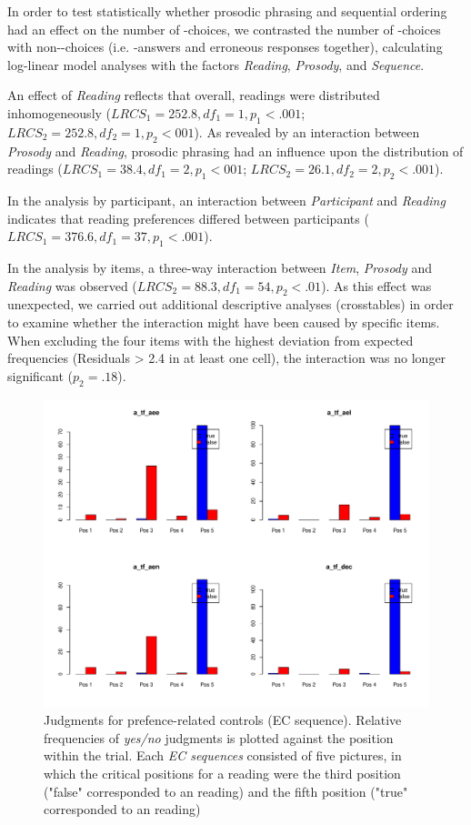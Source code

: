 \documentclass[fleqn,reqno,10pt,draft]{article}
\newcommand{\lc}{\acro{lc}}
\newcommand{\ec}{\acro{ec}}
\begin{document}
In order to test statistically whether prosodic phrasing and sequential ordering 
had an effect on the number of \ec-choices, we contrasted the number of \ec-choices
with non-\ec -choices (i.e. \lc-answers and erroneous responses together), calculating
log-linear model analyses with the factors {\it Reading}, {\it Prosody}, and 
{\it Sequence}.

An effect of {\it Reading} reflects that overall, readings were distributed inhomogeneously
($LRCS_1 = 252.8, df_1 =1, p_1 < .001$; $LRCS_2 = 252.8, df_2 =1, p_2 < 001$). 
As revealed by an interaction between {\it Prosody} and
{\it Reading}, prosodic phrasing had an influence upon the distribution of readings 
($LRCS_1 = 38.4, df_1 =2, p_1 < 001$; $LRCS_2 = 26.1, df_2 =2, p_2 < .001$). 

In the analysis by participant, an interaction between {\it Participant} and {\it Reading}
indicates that reading preferences differed between participants ($LRCS_1 = 376.6,df_1 =37,  
p_1 < .001$). 

In the analysis by items, a three-way interaction between {\it Item}, {\it Prosody} and 
{\it Reading} was observed ($LRCS_2 = 88.3, df_1 =54, p_2 < .01$). As this effect was 
unexpected, we carried out additional descriptive analyses (crosstables) in order to examine whether
the interaction might have been caused by specific items. When excluding the four items with
the highest deviation from expected frequencies (Residuals > 2.4 in at least one cell), 
the interaction was no longer significant ($p_2 = .18$).

\begin{figure}
\includegraphics[width=\textwidth]{../pictures/paper/graph_ec.pdf}
\caption{Judgments for prefence-related controls (EC sequence). Relative frequencies
of {\it yes/no} judgments is plotted against the position within the
trial. Each {\it EC sequences} consisted of five pictures, in which the
critical positions for a reading were the third position ("false" corresponded
to an \ec reading) and the fifth position ("true" corresponded to an \lc reading)}
\label{Fig:EC_judgments}
\end{figure}
\end{document}
